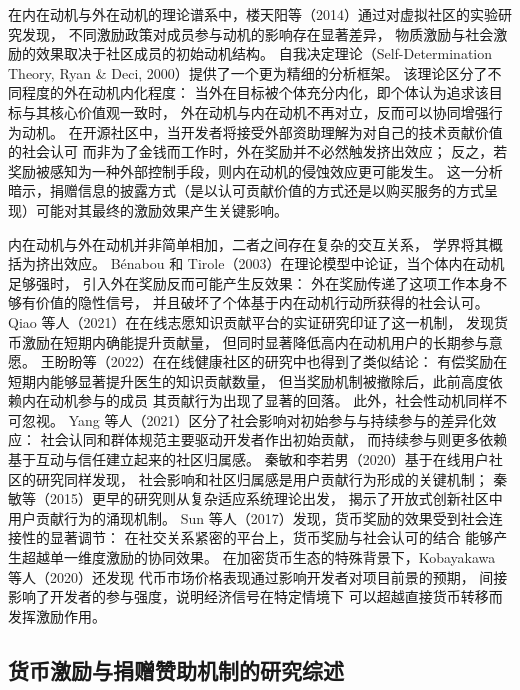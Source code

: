 \documentclass[
    type = master, %
    degree = professional,        %
    decl-page,  %
    twoside,                %
    fontset = fandol %
  ]{njuthesis}
\begin{document}
在内在动机与外在动机的理论谱系中，楼天阳等（2014）通过对虚拟社区的实验研究发现，
不同激励政策对成员参与动机的影响存在显著差异，
物质激励与社会激励的效果取决于社区成员的初始动机结构\cite{lou2014incentive}。
自我决定理论（Self-Determination Theory, Ryan \& Deci, 2000）\cite{ryan2000self}提供了一个更为精细的分析框架。
该理论区分了不同程度的外在动机内化程度：
当外在目标被个体充分内化，即个体认为追求该目标与其核心价值观一致时，
外在动机与内在动机不再对立，反而可以协同增强行为动机。
在开源社区中，当开发者将接受外部资助理解为对自己的技术贡献价值的社会认可
而非为了金钱而工作时，外在奖励并不必然触发挤出效应；
反之，若奖励被感知为一种外部控制手段，则内在动机的侵蚀效应更可能发生。
这一分析暗示，捐赠信息的披露方式（是以认可贡献价值的方式还是以购买服务的方式呈现）可能对其最终的激励效果产生关键影响\cite{benabou2003intrinsic}。

内在动机与外在动机并非简单相加，二者之间存在复杂的交互关系，
学界将其概括为挤出效应。
Bénabou 和 Tirole（2003）在理论模型中论证，当个体内在动机足够强时，
引入外在奖励反而可能产生反效果：
外在奖励传递了这项工作本身不够有价值的隐性信号，
并且破坏了个体基于内在动机行动所获得的社会认可\cite{benabou2003intrinsic}。
Qiao 等人（2021）在在线志愿知识贡献平台的实证研究印证了这一机制，
发现货币激励在短期内确能提升贡献量，
但同时显著降低高内在动机用户的长期参与意愿\cite{qiao2021mitigating}。
王盼盼等（2022）在在线健康社区的研究中也得到了类似结论：
有偿奖励在短期内能够显著提升医生的知识贡献数量，
但当奖励机制被撤除后，此前高度依赖内在动机参与的成员
其贡献行为出现了显著的回落\cite{wang2022reward}。
此外，社会性动机同样不可忽视。
Yang 等人（2021）区分了社会影响对初始参与与持续参与的差异化效应：
社会认同和群体规范主要驱动开发者作出初始贡献，
而持续参与则更多依赖基于互动与信任建立起来的社区归属感\cite{yang2021differential}。
秦敏和李若男（2020）基于在线用户社区的研究同样发现，
社会影响和社区归属感是用户贡献行为形成的关键机制\cite{qin2020contribution}；
秦敏等（2015）更早的研究则从复杂适应系统理论出发，
揭示了开放式创新社区中用户贡献行为的涌现机制\cite{qin2015cas}。
Sun 等人（2017）发现，货币奖励的效果受到社会连接性的显著调节：
在社交关系紧密的平台上，货币奖励与社会认可的结合
能够产生超越单一维度激励的协同效果\cite{sun2017motivation}。
在加密货币生态的特殊背景下，Kobayakawa 等人（2020）还发现
代币市场价格表现通过影响开发者对项目前景的预期，
间接影响了开发者的参与强度，说明经济信号在特定情境下
可以超越直接货币转移而发挥激励作用\cite{kobayakawa2020impact}。

\subsection{货币激励与捐赠赞助机制的研究综述}
\end{document}
